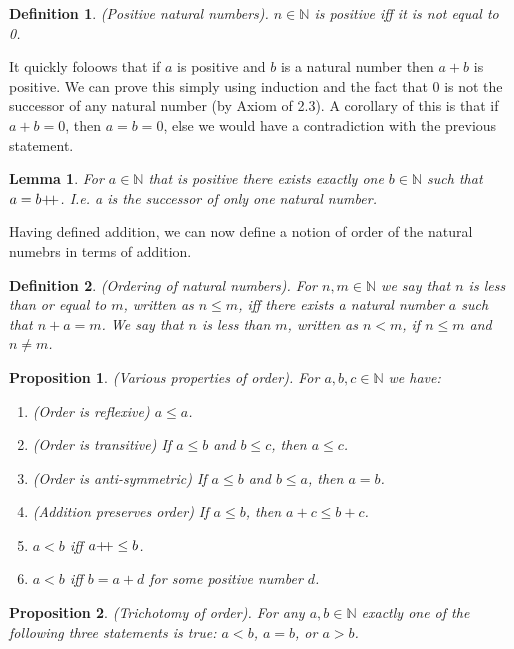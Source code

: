 \documentclass{article}
\newtheorem{definition}{Definition}[subsection]
\newtheorem{proposition}{Proposition}[subsection]
\newtheorem{lemma}{Lemma}[subsection]
\newcommand{\N}{\mathbb{N}}
\newcommand{\pp}{\mathbin{+\mkern-5mu+}}
\begin{document}
\begin{definition}
	(Positive natural numbers). $n \in \N$ is positive iff 
	it is not equal to 0.
\end{definition}

It quickly foloows that if $a$ is positive and $b$ is a natural 
number then $a +b$ is positive. We can prove this simply using
induction and the fact that $0$ is not the successor of any 
natural number (by Axiom of 2.3). A corollary of this is that 
if $a+b=0$, then $a=b=0$, else we would have a contradiction 
with the previous statement.

\begin{lemma}
	For $a\in\N$ that is positive there exists exactly one $b\in\N$ 
	such that $a = b\pp$. I.e. a is the successor of only 
	one natural number.
\end{lemma}

Having defined addition, we can now define a notion of 
order of the natural numebrs in terms of addition.

\begin{definition}
	(Ordering of natural numbers).	
	For $n,m \in \N$ we say that $n$ is less than or equal to $m$,
	written as $n \leq m$, iff there exists a natural number $a$ such that
	$n + a = m$. We say that $n$ is less than $m$, written as $n < m$,
	if $n \leq m$ and $n \neq m$.
\end{definition}

\begin{proposition}
	(Various properties of order). For $a,b,c \in \N$ we have:	

	\begin{enumerate}
		\item (Order is reflexive) $a \leq a$.	
		\item (Order is transitive) If $a \leq b$ and $b \leq c$, then $a \leq c$.
		\item (Order is anti-symmetric) If $a \leq b$ and $b \leq a$, then $a = b$.
		\item (Addition preserves order) If $a \leq b$, then $a + c \leq b + c$.
		\item $a < b$ iff $a\pp \leq b$.
		\item $a < b$ iff $b=a+d$ for some positive number $d$.
	\end{enumerate}
\end{proposition}

\begin{proposition}
	(Trichotomy of order). For any $a,b \in \N$ exactly one of the following 
	three statements is true: $a < b$, $a = b$, or $a > b$.	
\end{proposition}
\end{document}
